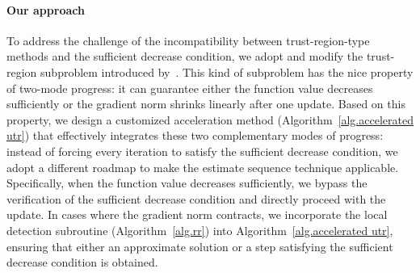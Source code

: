 \documentclass{article}
\begin{document}
\paragraph{Our approach}
To address the challenge of the incompatibility between trust-region-type methods and the sufficient decrease condition, we adopt and modify the trust-region subproblem introduced by~\citet{jiang2024nonconvexityuniversaltrustregionmethod}. This kind of subproblem has the nice property of two-mode progress: it can guarantee either the function value decreases sufficiently or the gradient norm shrinks linearly after one update. Based on this property, we design a customized acceleration method (Algorithm~\ref{alg.accelerated utr}) that effectively integrates these two complementary modes of progress: instead of forcing every iteration to satisfy the sufficient decrease condition, we adopt a different roadmap to make the estimate sequence technique applicable. Specifically, when the function value decreases sufficiently, we bypass the verification of the sufficient decrease condition and directly proceed with the update. In cases where the gradient norm contracts, we incorporate the local detection subroutine (Algorithm~\ref{alg.rr}) into Algorithm~\ref{alg.accelerated utr}, ensuring that either an approximate solution or a step satisfying the sufficient decrease condition is obtained.

\end{document}
